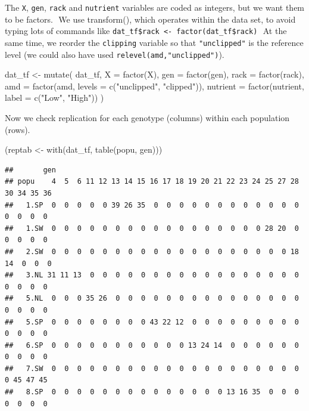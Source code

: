 \documentclass[
  12pt,
]{book}
\newenvironment{Shaded}{\begin{snugshade}}{\end{snugshade}}
\newcommand{\AttributeTok}[1]{\textcolor[rgb]{0.77,0.63,0.00}{#1}}
\newcommand{\FunctionTok}[1]{\textcolor[rgb]{0.00,0.00,0.00}{#1}}
\newcommand{\NormalTok}[1]{#1}
\newcommand{\OtherTok}[1]{\textcolor[rgb]{0.56,0.35,0.01}{#1}}
\newcommand{\StringTok}[1]{\textcolor[rgb]{0.31,0.60,0.02}{#1}}
\begin{document}
The \texttt{X}, \texttt{gen}, \texttt{rack} and \texttt{nutrient} variables are coded as integers, but we want them to be factors.
 We use transform(), which operates within the data set, to avoid typing lots of commands like \texttt{dat\_tf\$rack\ \textless{}-\ factor(dat\_tf\$rack)}
 At the same time, we reorder the \texttt{clipping} variable so that \texttt{"unclipped"} is the reference level (we could also have used \texttt{relevel(amd,"unclipped")}).

\begin{Shaded}
\begin{Highlighting}[]
\NormalTok{dat\_tf }\OtherTok{\textless{}{-}} \FunctionTok{mutate}\NormalTok{(}
\NormalTok{  dat\_tf,}
  \AttributeTok{X =} \FunctionTok{factor}\NormalTok{(X),}
  \AttributeTok{gen =} \FunctionTok{factor}\NormalTok{(gen),}
  \AttributeTok{rack =} \FunctionTok{factor}\NormalTok{(rack),}
  \AttributeTok{amd =} \FunctionTok{factor}\NormalTok{(amd, }\AttributeTok{levels =} \FunctionTok{c}\NormalTok{(}\StringTok{"unclipped"}\NormalTok{, }\StringTok{"clipped"}\NormalTok{)),}
  \AttributeTok{nutrient =} \FunctionTok{factor}\NormalTok{(nutrient, }\AttributeTok{label =} \FunctionTok{c}\NormalTok{(}\StringTok{"Low"}\NormalTok{, }\StringTok{"High"}\NormalTok{))}
\NormalTok{)}
\end{Highlighting}
\end{Shaded}

Now we check replication for each genotype (columns) within each population (rows).

\begin{Shaded}
\begin{Highlighting}[]
\NormalTok{(reptab }\OtherTok{\textless{}{-}} \FunctionTok{with}\NormalTok{(dat\_tf, }\FunctionTok{table}\NormalTok{(popu, gen)))}
\end{Highlighting}
\end{Shaded}

\begin{verbatim}
##       gen
## popu    4  5  6 11 12 13 14 15 16 17 18 19 20 21 22 23 24 25 27 28 30 34 35 36
##   1.SP  0  0  0  0  0 39 26 35  0  0  0  0  0  0  0  0  0  0  0  0  0  0  0  0
##   1.SW  0  0  0  0  0  0  0  0  0  0  0  0  0  0  0  0  0 28 20  0  0  0  0  0
##   2.SW  0  0  0  0  0  0  0  0  0  0  0  0  0  0  0  0  0  0  0 18 14  0  0  0
##   3.NL 31 11 13  0  0  0  0  0  0  0  0  0  0  0  0  0  0  0  0  0  0  0  0  0
##   5.NL  0  0  0 35 26  0  0  0  0  0  0  0  0  0  0  0  0  0  0  0  0  0  0  0
##   5.SP  0  0  0  0  0  0  0  0 43 22 12  0  0  0  0  0  0  0  0  0  0  0  0  0
##   6.SP  0  0  0  0  0  0  0  0  0  0  0 13 24 14  0  0  0  0  0  0  0  0  0  0
##   7.SW  0  0  0  0  0  0  0  0  0  0  0  0  0  0  0  0  0  0  0  0  0 45 47 45
##   8.SP  0  0  0  0  0  0  0  0  0  0  0  0  0  0 13 16 35  0  0  0  0  0  0  0
\end{verbatim}
\end{document}
